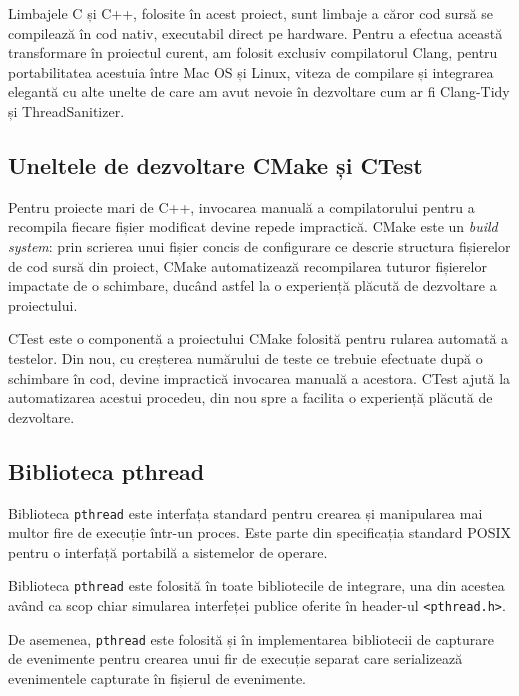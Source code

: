 Limbajele C și C++, folosite în acest proiect, sunt limbaje a căror cod
sursă se compilează în cod nativ, executabil direct pe hardware. Pentru
a efectua această transformare în proiectul curent, am folosit exclusiv
compilatorul Clang\cite{Clang}, pentru portabilitatea acestuia între Mac
OS și Linux, viteza de compilare și integrarea elegantă cu alte unelte
de care am avut nevoie în dezvoltare cum ar fi
Clang-Tidy\cite{ClangTidy} și ThreadSanitizer\cite{ThreadSanitizer}.

\subsection{Uneltele de dezvoltare CMake și CTest}

Pentru proiecte mari de C++, invocarea manuală a compilatorului pentru
a recompila fiecare fișier modificat devine repede impractică.
CMake\cite{CMake} este un \textit{build system}: prin scrierea unui
fișier concis de configurare ce descrie structura fișierelor de cod
sursă din proiect, CMake automatizează recompilarea tuturor fișierelor
impactate de o schimbare, ducând astfel la o experiență plăcută de
dezvoltare a proiectului.

CTest este o componentă a proiectului CMake folosită pentru rularea
automată a testelor. Din nou, cu creșterea numărului de teste ce
trebuie efectuate după o schimbare în cod, devine impractică invocarea
manuală a acestora. CTest ajută la automatizarea acestui procedeu, din
nou spre a facilita o experiență plăcută de dezvoltare.

\subsection{Biblioteca pthread}

Biblioteca \lstinline{pthread}\cite{pthread} este interfața standard
pentru crearea și manipularea mai multor fire de execuție într-un
proces. Este parte din specificația standard POSIX pentru o interfață
portabilă a sistemelor de operare.

Biblioteca \lstinline{pthread} este folosită în toate bibliotecile de
integrare, una din acestea având ca scop chiar simularea interfeței
publice oferite în header-ul \lstinline{<pthread.h>}.

De asemenea, \lstinline{pthread} este folosită și în implementarea
bibliotecii de capturare de evenimente pentru crearea unui fir de
execuție separat care serializează evenimentele capturate în fișierul de
evenimente.

